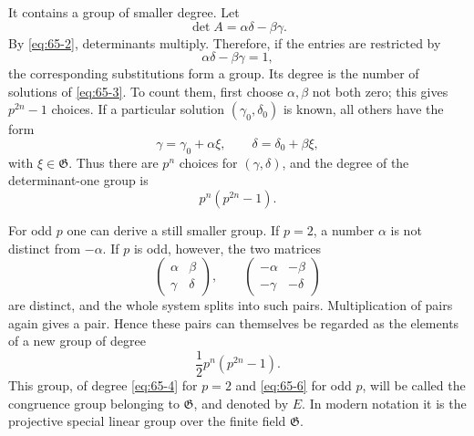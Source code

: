 \documentclass[11pt,a4paper]{article}
\begin{document}
It contains a group of smaller degree.  Let
\[
 \det A=\alpha\delta-\beta\gamma.
\]
By \eqref{eq:65-2}, determinants multiply.  Therefore, if the entries are restricted by
\begin{equation}\label{eq:65-3}
 \alpha\delta-\beta\gamma=1,
\end{equation}
the corresponding substitutions form a group.  Its degree is the number of solutions of \eqref{eq:65-3}.  To count them, first choose \(\alpha,\beta\) not both zero; this gives \(p^{2n}-1\) choices.  If a particular solution \((\gamma_0,\delta_0)\) is known, all others have the form
\[
 \gamma=\gamma_0+\alpha\xi,
 \qquad
 \delta=\delta_0+\beta\xi,
\]
with \(\xi\in\mathfrak G\).  Thus there are \(p^n\) choices for \((\gamma,\delta)\), and the degree of the determinant-one group is
\begin{equation}\label{eq:65-4}
 p^n(p^{2n}-1).
\end{equation}

For odd \(p\) one can derive a still smaller group.  If \(p=2\), a number \(\alpha\) is not distinct from \(-\alpha\).  If \(p\) is odd, however, the two matrices
\begin{equation}\label{eq:65-5}
 \begin{pmatrix}\alpha&\beta\\\gamma&\delta\end{pmatrix},
 \qquad
 \begin{pmatrix}-\alpha&-\beta\\-\gamma&-\delta\end{pmatrix}
\end{equation}
are distinct, and the whole system splits into such pairs.  Multiplication of pairs again gives a pair.  Hence these pairs can themselves be regarded as the elements of a new group of degree
\begin{equation}\label{eq:65-6}
 \frac12 p^n(p^{2n}-1).
\end{equation}
This group, of degree \eqref{eq:65-4} for \(p=2\) and \eqref{eq:65-6} for odd \(p\), will be called the congruence group belonging to \(\mathfrak G\), and denoted by \(E\).  In modern notation it is the projective special linear group over the finite field \(\mathfrak G\).
\end{document}
